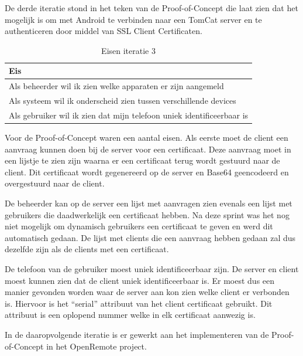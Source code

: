 \documentclass{article}
\begin{document}
De derde iteratie stond in het teken van de Proof-of-Concept die laat zien
dat het mogelijk is om met Android te verbinden naar een TomCat server en
te authenticeren door middel van SSL Client Certificaten.

\begin{table}[h!]
  \caption{Eisen iteratie 3}
  \begin{center}
    \begin{tabular}{|| l ||}\hline
        Eis                                                                   \\\hline\hline
        Als beheerder wil ik zien welke apparaten er zijn aangemeld           \\\hline
        Als systeem wil ik onderscheid zien tussen verschillende devices      \\\hline
        Als gebruiker wil ik zien dat mijn telefoon uniek identificeerbaar is \\\hline
    \end{tabular}
  \end{center}
\end{table}

Voor de Proof-of-Concept waren een aantal eisen. Als eerste moet de client
een aanvraag kunnen doen bij de server voor een certificaat. Deze aanvraag
moet in een lijstje te zien zijn waarna er een certificaat terug wordt
gestuurd naar de client. Dit certificaat wordt gegenereerd op de server en
Base64 geencodeerd en overgestuurd naar de client.

De beheerder kan op de server een lijst met aanvragen zien evenals een
lijst met gebruikers die daadwerkelijk een certificaat hebben. Na deze
sprint was het nog niet mogelijk om dynamisch gebruikers een certificaat te
geven en werd dit automatisch gedaan. De lijst met clients die een aanvraag
hebben gedaan zal dus dezelfde zijn als de clients met een certificaat.

De telefoon van de gebruiker moest uniek identificeerbaar zijn. De server
en client moest kunnen zien dat de client uniek identificeerbaar is. Er
moest dus een manier gevonden worden waar de server aan kon zien welke
client er verbonden is. Hiervoor is het “serial” attribuut van het client
certificaat gebruikt. Dit attribuut is een oplopend nummer welke in elk
certificaat aanwezig is.

In de daaropvolgende iteratie is er gewerkt aan het implementeren van de
Proof-of-Concept in het OpenRemote project.
\end{document}
